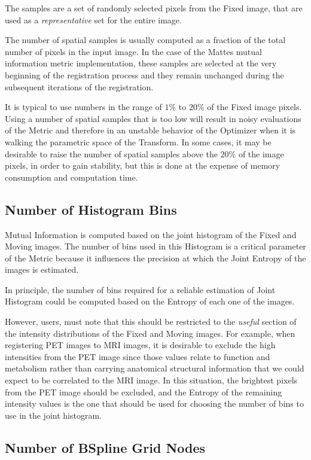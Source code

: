 \documentclass{InsightArticle}
\begin{document}
The samples are a set of randomly selected pixels from the Fixed image, that
are used as a \emph{representative} set for the entire image.

The number of spatial samples is usually computed as a fraction of the total
number of pixels in the input image.  In the case of the Mattes mutual
information metric implementation, these samples are selected at the very
beginning of the registration process and they remain unchanged during the
subsequent iterations of the registration.

It is typical to use numbers in the range of $1\%$ to $20\%$ of the Fixed image
pixels. Using a number of spatial samples that is too low will result in noisy
evaluations of the Metric and therefore in an unstable behavior of the
Optimizer when it is walking the parametric space of the Transform. In some
cases, it may be desirable to raise the number of spatial samples above the
$20\%$ of the image pixels, in order to gain stability, but this is done at the
expense of memory consumption and computation time.

\subsection{Number of Histogram Bins}

Mutual Information is computed based on the joint histogram of the Fixed and
Moving images. The number of bins used in this Histogram is a critical
parameter of the Metric because it influences the precision at which the Joint
Entropy of the images is estimated.

In principle, the number of bins required for a reliable estimation of Joint 
Histogram could be computed based on the Entropy of each one of the images.

However, users, must note that this should be restricted to the \emph{useful}
section of the intensity distributions of the Fixed and Moving images. For
example, when registering PET images to MRI images, it is desirable to exclude
the high intensities from the PET image since those values relate to function
and metabolism rather than carrying anatomical structural information that we
could expect to be correlated to the MRI image. In this situation, the
brightest pixels from the PET image should be excluded, and the Entropy of the
remaining intensity values is the one that should be used for choosing the
number of bins to use in the joint histogram.

\subsection{Number of BSpline Grid Nodes}
\end{document}
